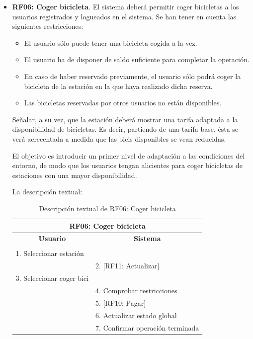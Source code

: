 \begin{itemize}
	\FloatBarrier
	\item \textbf{RF06: Coger bicicleta}. El sistema deberá permitir coger bicicletas a los usuarios registrados y logueados en el sistema. Se han tener en cuenta las siguientes restricciones:
	\begin{itemize}
		\item El usuario sólo puede tener una bicicleta cogida a la vez.
		\item El usuario ha de disponer de saldo suficiente para completar la operación.
		\item En caso de haber reservado previamente, el usuario sólo podrá coger la bicicleta de la estación en la que haya realizado dicha reserva.
		\item Las bicicletas reservadas por otros usuarios no están disponibles.
	\end{itemize}
	Señalar, a su vez, que la estación deberá mostrar una tarifa adaptada a la disponibilidad de bicicletas. Es decir, partiendo de una tarifa base, ésta se verá acrecentada a medida que las bicis disponibles se vean reducidas. 
	
	El objetivo es introducir un primer nivel de adaptación a las condiciones del entorno, de modo que los usuarios tengan alicientes para coger bicicletas de estaciones con una mayor disponibilidad. 
	
	La descripción textual:
	\begin{table}[h]
		\centering	
		\begin{tabular}{|l|l|}
			\hline
			\multicolumn{2}{|c|}{\textbf{RF06: Coger bicicleta}} \\ \hline
			\multicolumn{1}{|c|}{\textbf{Usuario}} & \multicolumn{1}{c|}{\textbf{Sistema}} \\ \hline
			[Pto. inclusión: RF02: Loguear usuario] &\\ \hline
			1. Seleccionar estación &\\ \hline
			& 2. [RF11: Actualizar] \\ \hline
			3. Seleccionar coger bici &\\ \hline
			& 4. Comprobar restricciones \\ \hline
			& 5. [RF10: Pagar] \\ \hline
			& 6. Actualizar estado global \\ \hline
			& 7. Confirmar operación terminada \\ \hline 	
		\end{tabular}
		\caption{Descripción textual de RF06: Coger bicicleta}
		\label{tab:tablaDescTextualRF06}
	\end{table}
	

\end{itemize}
